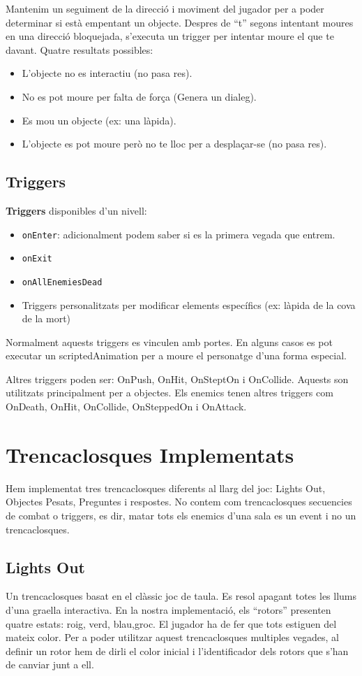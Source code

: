 \documentclass[a4paper,12pt]{article}
\begin{document}
Mantenim un seguiment de la direcció i moviment del jugador per a poder determinar si està empentant un objecte. Despres de ``t'' segons intentant moures en una direcció bloquejada, s'executa un trigger per intentar moure el que te davant. Quatre resultats possibles:
\begin{itemize}
    \item L'objecte no es interactiu (no pasa res).
    \item No es pot moure per falta de força (Genera un dialeg).
    \item Es mou un objecte (ex: una làpida).
    \item L'objecte es pot moure però no te lloc per a desplaçar-se (no pasa res).
\end{itemize}
 
\subsection{Triggers}
\textbf{Triggers} disponibles d'un nivell:
\begin{itemize}
    \item \texttt{onEnter}: adicionalment podem saber si es la primera vegada que entrem.
    \item \texttt{onExit}
    \item \texttt{onAllEnemiesDead}
    \item Triggers personalitzats per modificar elements específics (ex: làpida de la cova de la mort)
\end{itemize}

Normalment aquests triggers es vinculen amb portes. En alguns casos es pot executar un scriptedAnimation per a moure el personatge d'una forma especial.

Altres triggers poden ser: OnPush, OnHit, OnSteptOn i OnCollide. Aquests son utilitzats principalment per a objectes. Els enemics tenen altres triggers com OnDeath, OnHit, OnCollide, OnSteppedOn i OnAttack.

\section{Trencaclosques Implementats}
Hem implementat tres trencaclosques diferents al llarg del joc: Lights Out, Objectes Pesats, Preguntes i respostes. No contem com trencaclosques secuencies de combat o triggers, es dir, matar tots els enemics d'una sala es un event i no un trencaclosques.


\subsection{Lights Out}
Un trencaclosques basat en el clàssic joc de taula. Es resol apagant totes les llums d'una graella interactiva. En la nostra implementació, els ``rotors'' presenten quatre estats: roig, verd, blau,groc. El jugador ha de fer que tots estiguen del mateix color. Per a poder utilitzar aquest trencaclosques multiples vegades, al definir un rotor hem de dirli el color inicial i l'identificador dels rotors que s'han de canviar junt a ell.
\end{document}

